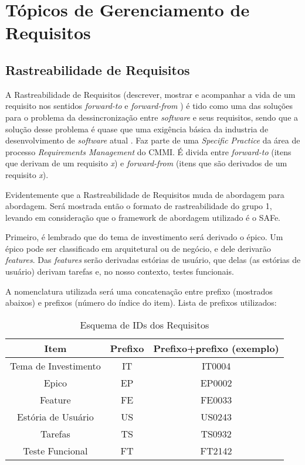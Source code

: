 
\chapter[Tópicos de Gerenciamento de Requisitos]{Tópicos de Gerenciamento de Requisitos}
\section{Rastreabilidade de Requisitos}
A Rastreabilidade de Requisitos (descrever, mostrar e acompanhar a vida de um requisito nos sentidos \emph{forward-to} e \emph{forward-from} \cite{garcia001}) é tido como uma das soluções para o problema da dessincronização entre \emph{software} e seus requisitos, sendo que a solução desse problema é quase que uma exigência básica da industria de desenvolvimento de \emph{software} atual \cite{leal001}. Faz parte de uma \emph{Specific Practice} da área de processo \emph{Requirements Management} do CMMI. É divida entre \emph{forward-to} (itens que derivam de um requisito \emph{x}) e \emph{forward-from} (itens que são derivados de um requisito \emph{x}).

Evidentemente que a Rastreabilidade de Requisitos muda de abordagem para abordagem. Será mostrada então o formato de rastreabilidade do grupo 1, levando em consideração que o framework de abordagem utilizado é o SAFe.

Primeiro, é lembrado que do tema de investimento será derivado o épico. Um épico pode ser classificado em arquitetural ou de negócio, e dele derivarão \emph{features}. Das \emph{features} serão derivadas estórias de usuário, que delas (as estórias de usuário) derivam tarefas e, no nosso contexto, testes funcionais.

A nomenclatura utilizada será uma concatenação entre prefixo (mostrados abaixos) e prefixos (número do índice do item). Lista de prefixos utilizados:

\begin{table}[ht]
\caption{Esquema de IDs dos Requisitos}
  \begin{tabular}{c | c | c}
    \hline
    Item & Prefixo & Prefixo+prefixo (exemplo)\\ \hline
    Tema de Investimento & IT & IT0004 \\
    Epico & EP & EP0002 \\
    Feature & FE & FE0033 \\
    Estória de Usuário & US & US0243 \\
    Tarefas & TS & TS0932 \\
    Teste Funcional & FT & FT2142 \\
    \hline
  \end{tabular}
\end{table}

